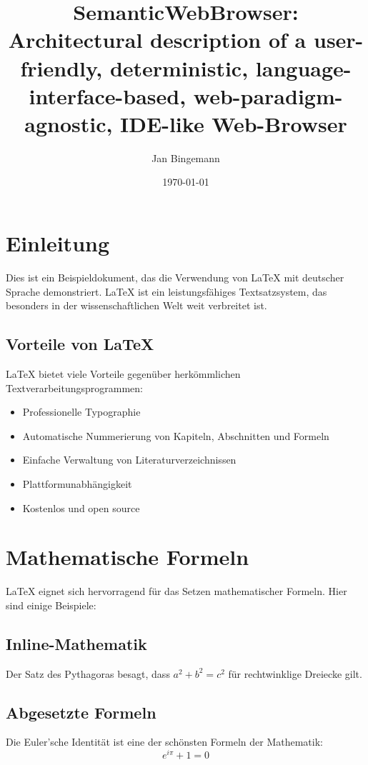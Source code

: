 \documentclass[12pt,a4paper]{article}
\title{SemanticWebBrowser: Architectural description of a user-friendly, deterministic, language-interface-based, web-paradigm-agnostic, IDE-like Web-Browser}
\author{Jan Bingemann}
\date{\today}
\begin{document}
\maketitle

\tableofcontents
\newpage

\section{Einleitung}

Dies ist ein Beispieldokument, das die Verwendung von LaTeX mit deutscher Sprache demonstriert. LaTeX ist ein leistungsfähiges Textsatzsystem, das besonders in der wissenschaftlichen Welt weit verbreitet ist.

\subsection{Vorteile von LaTeX}

LaTeX bietet viele Vorteile gegenüber herkömmlichen Textverarbeitungsprogrammen:

\begin{itemize}
    \item Professionelle Typographie
    \item Automatische Nummerierung von Kapiteln, Abschnitten und Formeln
    \item Einfache Verwaltung von Literaturverzeichnissen
    \item Plattformunabhängigkeit
    \item Kostenlos und open source
\end{itemize}

\section{Mathematische Formeln}

LaTeX eignet sich hervorragend für das Setzen mathematischer Formeln. Hier sind einige Beispiele:

\subsection{Inline-Mathematik}
Der Satz des Pythagoras besagt, dass $a^2 + b^2 = c^2$ für rechtwinklige Dreiecke gilt.

\subsection{Abgesetzte Formeln}
Die Euler'sche Identität ist eine der schönsten Formeln der Mathematik:
\begin{equation}
    e^{i\pi} + 1 = 0
\end{equation}
\end{document}
